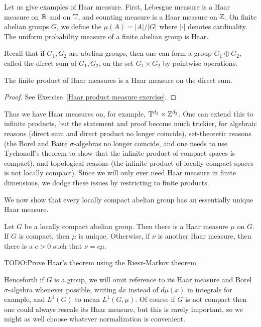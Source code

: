 Let us give examples of Haar measure.
First, Lebesgue measure is a Haar measure on $\mathbb{R}$ and on $\mathbb{T}$, and counting measure is a Haar measure on $\mathbb{Z}$.
On finite abelian groups $G$, we define the  $\mu(A) = |A|/|G|$ where $|\cdot|$ denotes cardinality.
The uniform probability measure of a finite abelian group is Haar.

Recall that if $G_{1}, G_{2}$ are abelian groups, then one can form a group $G_{1} \oplus G_{2}$, called the direct sum of $G_{1},G_{2}$, on the set $G_{1} \times G_{2}$ by pointwise operations.
\begin{lemma}\label{Haar product measure}
The finite product of Haar measures is a Haar measure on the direct sum.
\end{lemma}
\begin{proof}
See Exercise~\ref{Haar product measure exercise}.
\end{proof}
Thus we have Haar measures on, for example, $\mathbb{T}^{d_{1}} \times \mathbb{Z}^{d_{2}}$.
One can extend this to infinite products, but the statement and proof become much trickier, for algebraic reasons (direct sum and direct product no longer coincide), set-theoretic reasons (the Borel and Baire $\sigma$-algebras no longer coincide, and one needs to use Tychonoff's theorem to show that the infinite product of compact spaces is compact), and topological reasons (the infinite product of locally compact spaces is not locally compact).
Since we will only ever need Haar measure in finite dimensions, we dodge these issues by restricting to finite products.

We now show that every locally compact abelian group has an essentially unique Haar measure.
\begin{theorem}
Let $G$ be a locally compact abelian group.
Then there is a Haar measure $\mu$ on $G$.
If $G$ is compact, then $\mu$ is unique.
Otherwise, if $\nu$ is another Haar measure, then there is a $c > 0$ such that $\nu = c\mu$.
\end{theorem}
TODO:\@ Prove Haar's theorem using the Riesz-Markov theorem.

Henceforth if $G$ is a group, we will omit reference to its Haar measure and Borel $\sigma$-algebra whenever possible, writing $dx$ instead of $d\mu(x)$ in integrals for example, and $L^{1}(G)$ to mean $L^{1}(G, \mu)$.
Of course if $G$ is not compact then one could always rescale its Haar measure, but this is rarely important, so we might as well choose whatever normalization is convenient.

